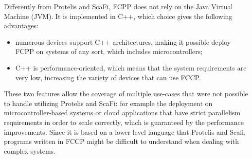 Differently from Protelis and ScaFi, FCPP does not rely on the Java Virtual Machine (JVM). It is implemented in C++, which choice gives the following advantages:
\begin{itemize}
    \item numerous devices support C++ architectures, making it possible deploy FCPP on systems of any sort, which includes microcontrollers;
    \item C++ is performance-oriented, which means that the system requirements are very low, increasing the variety of devices that can use FCCP.
\end{itemize}

These two features allow the coverage of multiple use-cases that were not possible to handle utilizing Protelis and ScaFi: for example the deployment on microcontroller-based systems or cloud applications that have strict parallelism requirements in order to scale correctly, which is guaranteed by the performance improvements.\newline
Since it is based on a lower level language that Protelis and Scafi, programs written in FCCP might be difficult to understand when dealing with complex systems.

